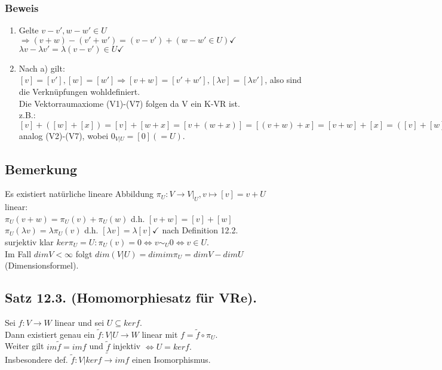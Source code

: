 \documentclass[a4paper, 12pt]{extarticle}
\newcommand{\gdw}{\Leftrightarrow}
\begin{document}
\subsubsection*{Beweis}
\begin{enumerate}[label=\alph*)]
	\item
	Gelte $v-v', w-w' \in U$ \\ 
	$ \Rightarrow (v+w)-(v'+w') = (v-v') + (w-w' \in U) \checkmark$ \\
	$\lambda v - \lambda v' = \lambda (v-v') \in U \checkmark$
	\item
	Nach a) gilt: $[v]=[v'], [w]=[w'] \Rightarrow [v+w] = [v'+w'], [\lambda v] = [\lambda v']$, also sind die Verknüpfungen wohldefiniert. \\
	Die Vektorraumaxiome (V1)-(V7) folgen da V ein K-VR ist. \\
	z.B.: $[v]+([w] + [x]) = [v] + [w+x] = [v+(w+x)] = [(v+w) + x] = [v+w] + [x] = ([v] + [w]) + [x]$ \\
	analog (V2)-(V7), wobei $0_{V|U} = [0] (=U)$.
\end{enumerate}
\subsection*{Bemerkung}
Es existiert natürliche lineare Abbildung $\pi_U: V\to V|_U, v\mapsto [v] = v+U$ \\
linear:\\
$\pi_U(v+w) = \pi_U(v) + \pi_U(w)$ d.h. $[v+w] = [v] + [w]$ \\
$\pi_U(\lambda v) = \lambda \pi_U (v)$ d.h. $[\lambda v] = \lambda [v] \checkmark $ nach Definition 12.2. \\
surjektiv klar $ker \pi_U = U: \pi_U(v) = 0 \gdw v\sim_U 0 \gdw v\in U$. \\
Im Fall $dim V < \infty$ folgt $dim(V|U) = dim im \pi_U = dim V - dim U$  (Dimensionsformel).
\subsection*{Satz 12.3. (Homomorphiesatz für VRe).}
Sei $f:V\to W$ linear und sei $U\subseteq ker f$. \\
Dann existiert genau ein $\tilde f: V|U \to W$ linear mit $f = \tilde f \circ \pi_U.$ \\
Weiter gilt $im \tilde f = im f$ und $\tilde f$ injektiv $\gdw U = kerf.$ \\
Insbesondere def. $\tilde f: V|kerf \tilde\to imf$ einen Isomorphismus.
\end{document}
